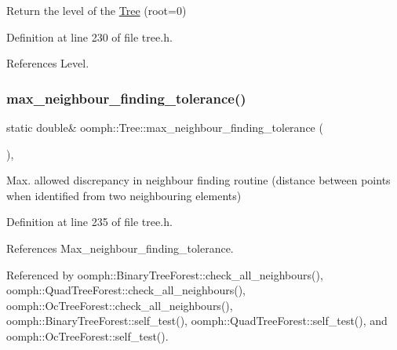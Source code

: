 Return the level of the \hyperlink{classoomph_1_1Tree}{Tree} (root=0) 



Definition at line 230 of file tree.\+h.



References Level.

\mbox{\label{classoomph_1_1Tree_affbae3271da943dfc23645ade966aef9}} 
\subsubsection{\texorpdfstring{max\+\_\+neighbour\+\_\+finding\+\_\+tolerance()}{max\_neighbour\_finding\_tolerance()}}
{\footnotesize\ttfamily static double\& oomph\+::\+Tree\+::max\+\_\+neighbour\+\_\+finding\+\_\+tolerance (\begin{DoxyParamCaption}{ }\end{DoxyParamCaption})\hspace{0.3cm}{\ttfamily [inline]}, {\ttfamily [static]}}



Max. allowed discrepancy in neighbour finding routine (distance between points when identified from two neighbouring elements) 



Definition at line 235 of file tree.\+h.



References Max\+\_\+neighbour\+\_\+finding\+\_\+tolerance.



Referenced by oomph\+::\+Binary\+Tree\+Forest\+::check\+\_\+all\+\_\+neighbours(), oomph\+::\+Quad\+Tree\+Forest\+::check\+\_\+all\+\_\+neighbours(), oomph\+::\+Oc\+Tree\+Forest\+::check\+\_\+all\+\_\+neighbours(), oomph\+::\+Binary\+Tree\+Forest\+::self\+\_\+test(), oomph\+::\+Quad\+Tree\+Forest\+::self\+\_\+test(), and oomph\+::\+Oc\+Tree\+Forest\+::self\+\_\+test().

\mbox{\label{classoomph_1_1Tree_af4f977931ece6b719a9e616037bb2481}} 
